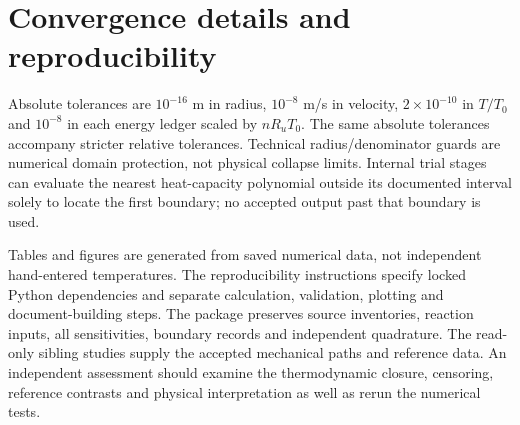 \documentclass[10pt,a4paper]{article}
\begin{document}
\section{Convergence details and reproducibility}
\begin{table}[H]\centering\small
\caption{Selected saturated-mixture convergence comparisons against production, including censored cases. Time differences refer to the refined thermal peak; a one-period change in the weak 1.0 bar case selects a nearly tied cycle (Section 8). Full input-grid and Model 0/1 comparisons are retained in CSV.}

\end{table}
Absolute tolerances are $10^{-16}$ m in radius, $10^{-8}$ m/s in velocity, $2\times10^{-10}$ in $T/T_0$ and $10^{-8}$ in each energy ledger scaled by $nR_uT_0$. The same absolute tolerances accompany stricter relative tolerances. Technical radius/denominator guards are numerical domain protection, not physical collapse limits. Internal trial stages can evaluate the nearest heat-capacity polynomial outside its documented interval solely to locate the first boundary; no accepted output past that boundary is used.

Tables and figures are generated from saved numerical data, not independent hand-entered temperatures. The reproducibility instructions specify locked Python dependencies and separate calculation, validation, plotting and document-building steps. The package preserves source inventories, reaction inputs, all sensitivities, boundary records and independent quadrature. The read-only sibling studies supply the accepted mechanical paths and reference data. An independent assessment should examine the thermodynamic closure, censoring, reference contrasts and physical interpretation as well as rerun the numerical tests.
\end{document}
